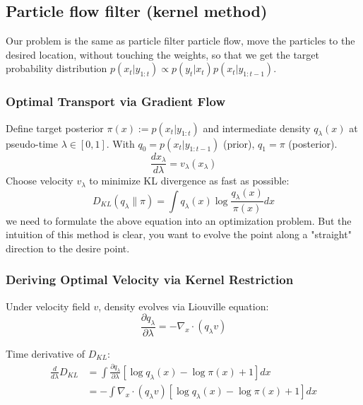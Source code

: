 \documentclass{article}
\begin{document}
\subsection{Particle flow filter (kernel method)}


Our problem is the same as particle filter particle flow, move the particles to the desired location, without touching the weights, so that we get the target probability distribution $p(x_t | y_{1:t}) \propto p(y_t | x_t) p(x_t | y_{1:t-1})$. 

\subsubsection{Optimal Transport via Gradient Flow}

Define target posterior $\pi(x) := p(x_t | y_{1:t})$ and intermediate density $q_\lambda(x)$ at pseudo-time $\lambda \in [0,1]$. With $q_0 = p(x_t | y_{1:t-1})$ (prior), $q_1 = \pi$ (posterior).
\begin{equation}
\frac{dx_\lambda}{d\lambda} = v_\lambda(x_\lambda)
\end{equation}
Choose velocity $v_\lambda$ to minimize KL divergence as fast as possible:
\begin{equation}
D_{KL}(q_\lambda \| \pi) = \int q_\lambda(x) \log \frac{q_\lambda(x)}{\pi(x)} dx
\end{equation}
we need to formulate the above equation into an optimization problem. But the intuition of this method is clear, you want to evolve the point along a "straight" direction to the desire point. 


\subsubsection{Deriving Optimal Velocity via Kernel Restriction}

Under velocity field $v$, density evolves via Liouville equation:
\begin{equation}
\frac{\partial q_\lambda}{\partial \lambda} = -\nabla_x \cdot (q_\lambda v)
\end{equation}

Time derivative of $D_{KL}$:
\begin{align}
\frac{d}{d\lambda} D_{KL} &= \int \frac{\partial q_\lambda}{\partial \lambda} \left[\log q_\lambda(x) - \log \pi(x) + 1\right] dx \\
&= -\int \nabla_x \cdot (q_\lambda v) \left[\log q_\lambda(x) - \log \pi(x) + 1\right] dx
\end{align}
\end{document}
